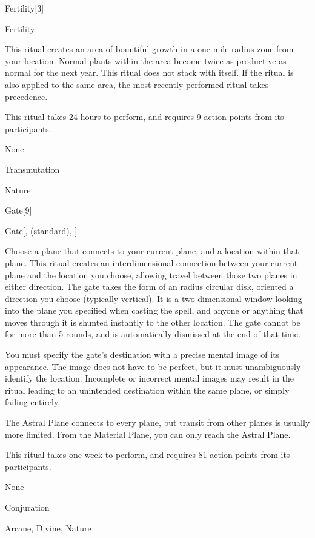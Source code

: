 \begin{spellsection}{Fertility}[3]


\begin{ability}{Fertility}

This ritual creates an area of bountiful growth in a one mile radius zone from your location.
Normal plants within the area become twice as productive as normal for the next year.
This ritual does not stack with itself.
If the  ritual is also applied to the same area, the most recently performed ritual takes precedence.

This ritual takes 24 hours to perform, and requires 9 action points from its participants.

\end{ability}


 None

 Transmutation

 Nature
\end{spellsection}


\begin{spellsection}{Gate}[9]


\begin{ability}{Gate}[,  (standard), ]

Choose a plane that connects to your current plane, and a location within that plane.
This ritual creates an interdimensional connection between your current plane and the location you choose, allowing travel between those two planes in either direction.
The gate takes the form of an \areasmall radius circular disk, oriented a direction you choose (typically vertical).
It is a two-dimensional window looking into the plane you specified when casting the spell, and anyone or anything that moves through it is shunted instantly to the other location.
The gate cannot be  for more than 5 rounds, and is automatically dismissed at the end of that time.

You must specify the gate's destination with a precise mental image of its appearance.
The image does not have to be perfect, but it must unambiguously identify the location.
Incomplete or incorrect mental images may result in the ritual leading to an unintended destination within the same plane, or simply failing entirely.

The Astral Plane connects to every plane, but transit from other planes is usually more limited.
From the Material Plane, you can only reach the Astral Plane.

This ritual takes one week to perform, and requires 81 action points from its participants.

\end{ability}


 None

 Conjuration

 Arcane, Divine, Nature
\end{spellsection}


